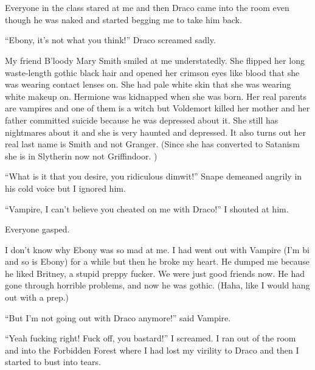 \section{}



Everyone in the class stared at me and then Draco came into the room even though he was naked and started begging me to take him back.

\enquote{Ebony, it's not what you think!} Draco screamed sadly.

My friend B'loody Mary Smith smiled at me understatedly. She flipped her long waste-length gothic black hair and opened her crimson eyes like blood that she was wearing contact lenses on. She had pale white skin that she was wearing white makeup on. Hermione was kidnapped when she was born. Her real parents are vampires and one of them is a witch but Voldemort killed her mother and her father committed suicide because he was depressed about it. She still has nightmares about it and she is very haunted and depressed. It also turns out her real last name is Smith and not Granger. (Since she has converted to Satanism she is in Slytherin now not Griffindoor. )

\enquote{What is it that you desire, you ridiculous dimwit!} Snape demeaned angrily in his cold voice but I ignored him.

\enquote{Vampire, I can't believe you cheated on me with Draco!} I shouted at him.

Everyone gasped.

I don't know why Ebony was so mad at me. I had went out with Vampire (I'm bi and so is Ebony) for a while but then he broke my heart. He dumped me because he liked Britney, a stupid preppy fucker. We were just good friends now. He had gone through horrible problems, and now he was gothic. (Haha, like I would hang out with a prep.)

\enquote{But I'm not going out with Draco anymore!} said Vampire.

\enquote{Yeah fucking right! Fuck off, you bastard!} I screamed. I ran out of the room and into the Forbidden Forest where I had lost my virility to Draco and then I started to bust into tears.
